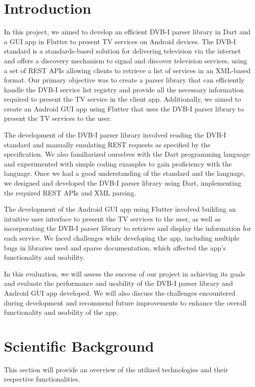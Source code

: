 \documentclass[conference]{IEEEtran}
\begin{document}
\section{Introduction}
In this project, we aimed to develop an efficient DVB-I parser library in Dart and a GUI app in Flutter to present TV services on Android devices. The DVB-I standard is a standards-based solution for delivering television via the internet and offers a discovery mechanism to signal and discover television services, using a set of REST APIs allowing clients to retrieve a list of services in an XML-based format. Our primary objective was to create a parser library that can efficiently handle the DVB-I service list registry and provide all the necessary information required to present the TV service in the client app. Additionally, we aimed to create an Android GUI app using Flutter that uses the DVB-I parser library to present the TV services to the user. 

The development of the DVB-I parser library involved reading the DVB-I standard and manually emulating REST requests as specified by the specification. We also familiarized ourselves with the Dart programming language and experimented with simple coding examples to gain proficiency with the language. Once we had a good understanding of the standard and the language, we designed and developed the DVB-I parser library using Dart, implementing the required REST APIs and XML parsing. 

The development of the Android GUI app using Flutter involved building an intuitive user interface to present the TV services to the user, as well as incorporating the DVB-I parser library to retrieve and display the information for each service. We faced challenges while developing the app, including multiple bugs in libraries used and sparse documentation, which affected the app's functionality and usability.

In this evaluation, we will assess the success of our project in achieving its goals and evaluate the performance and usability of the DVB-I parser library and Android GUI app developed. We will also discuss the challenges encountered during development and recommend future improvements to enhance the overall functionality and usability of the app.

\section{Scientific Background}

This section will provide an overview of the utilized technologies and their respective functionalities.
\end{document}
